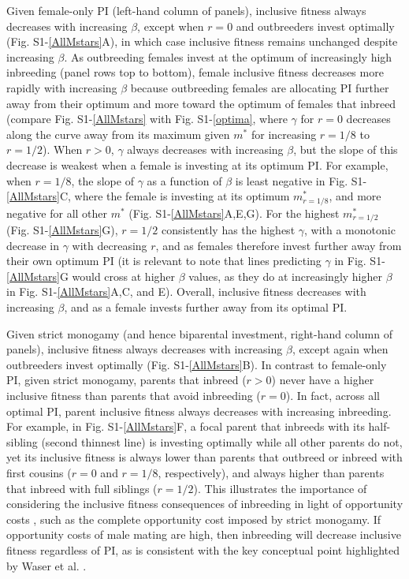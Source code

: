 \documentclass[12pt]{article}
\begin{document}
Given female-only PI (left-hand column of panels), inclusive fitness always decreases with increasing $\beta$, except when $r=0$ and outbreeders invest optimally (Fig. S1-\ref{AllMstars}A), in which case inclusive fitness remains unchanged despite increasing $\beta$. As outbreeding females invest at the optimum of increasingly high inbreeding (panel rows top to bottom), female inclusive fitness decreases more rapidly with increasing $\beta$ because outbreeding females are allocating PI further away from their optimum and more toward the optimum of females that inbreed (compare Fig. S1-\ref{AllMstars} with Fig. S1-\ref{optima}, where $\gamma$ for $r=0$ decreases along the curve away from its maximum given $m^{*}$ for increasing $r=1/8$ to $r=1/2$). When $r>0$, $\gamma$ always decreases with increasing $\beta$, but the slope of this decrease is weakest when a female is investing at its optimum PI. For example, when $r=1/8$, the slope of $\gamma$ as a function of $\beta$ is least negative in Fig. S1-\ref{AllMstars}C, where the female is investing at its optimum $m^{*}_{r=1/8}$, and more negative for all other $m^{*}$ (Fig. S1-\ref{AllMstars}A,E,G). For the highest $m^{*}_{r=1/2}$ (Fig. S1-\ref{AllMstars}G), $r=1/2$ consistently has the highest $\gamma$, with a monotonic decrease in $\gamma$ with decreasing $r$, and as females therefore invest further away from their own optimum PI (it is relevant to note that lines predicting $\gamma$ in Fig. S1-\ref{AllMstars}G would cross at higher $\beta$ values, as they do at increasingly higher $\beta$ in Fig. S1-\ref{AllMstars}A,C, and E). Overall, inclusive fitness decreases with increasing $\beta$, and as a female invests further away from its optimal PI.

Given strict monogamy (and hence biparental investment, right-hand column of panels), inclusive fitness always decreases with increasing $\beta$, except again when outbreeders invest optimally (Fig. S1-\ref{AllMstars}B). In contrast to female-only PI, given strict monogamy, parents that inbreed ($r>0$) never have a higher inclusive fitness than parents that avoid inbreeding ($r=0$). In fact, across all optimal PI, parent inclusive fitness always decreases with increasing inbreeding. For example, in Fig. S1-\ref{AllMstars}F, a focal parent that inbreeds with its half-sibling (second thinnest line) is investing optimally while all other parents do not, yet its inclusive fitness is always lower than parents that outbreed or inbreed with first cousins ($r=0$ and $r=1/8$, respectively), and always higher than parents that inbreed with full siblings ($r=1/2$). This illustrates the importance of considering the inclusive fitness consequences of inbreeding in light of opportunity costs \cite[][]{Waser1986}, such as the complete opportunity cost imposed by strict monogamy. If opportunity costs of male mating are high, then inbreeding will decrease inclusive fitness regardless of PI, as is consistent with the key conceptual point highlighted by Waser et al. \cite{Waser1986}.
\end{document}

